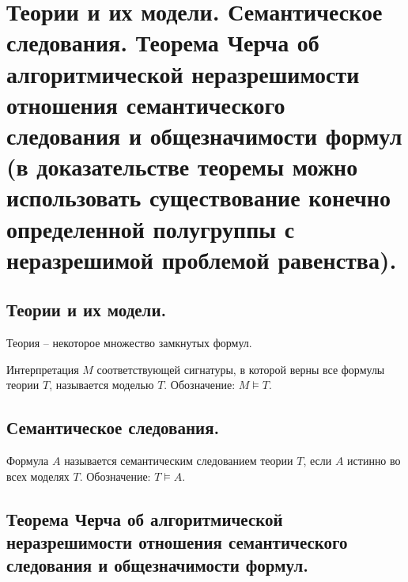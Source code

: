 \section{Теории и их модели. Семантическое следования. Теорема Черча об алгоритмической неразрешимости отношения семантического следования и общезначимости формул (в доказательстве теоремы можно использовать существование конечно определенной полугруппы с неразрешимой проблемой равенства).}

\subsection{Теории и их модели.}

\begin{definition}
  Теория -- некоторое множество замкнутых формул.
\end{definition}

\begin{definition}
  Интерпретация $M$ соответствующей сигнатуры, в которой верны все формулы теории $T$, называется моделью $T$. Обозначение: $M \vDash T$.
\end{definition}

\subsection{Семантическое следования.}

\begin{definition}
  Формула $A$ называется семантическим следованием теории $T$, если $A$ истинно во всех моделях $T$. Обозначение: $T \vDash A$.
\end{definition}

\subsection{Теорема Черча об алгоритмической неразрешимости отношения семантического следования и общезначимости формул.}

